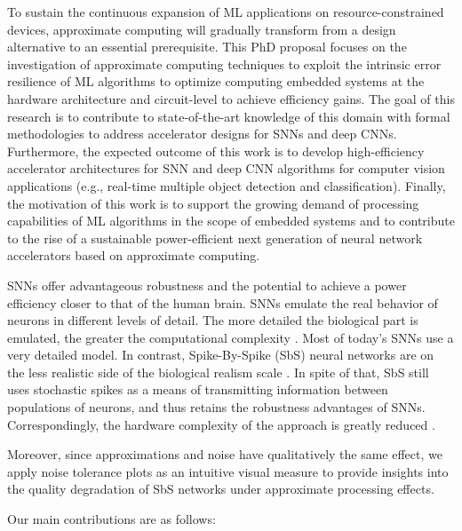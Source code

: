 	To sustain the continuous expansion of ML applications on resource-constrained devices, approximate computing will gradually transform from a design alternative to an essential prerequisite. This PhD proposal focuses on the investigation of approximate computing techniques to exploit the intrinsic error resilience of ML algorithms to optimize computing embedded systems at the hardware architecture and circuit-level to achieve efficiency gains. The goal of this research is to contribute to state-of-the-art knowledge of this domain with formal methodologies to address accelerator designs for SNNs and deep CNNs. Furthermore, the expected outcome of this work is to develop high-efficiency accelerator architectures for SNN and deep CNN algorithms for computer vision applications (e.g., real-time multiple object detection and classification). Finally, the motivation of this work is to support the growing demand of processing capabilities of ML algorithms in the scope of embedded systems and to contribute to the rise of a sustainable power-efficient next generation of neural network accelerators based on approximate computing.



SNNs offer advantageous robustness and the potential to achieve a power efficiency closer to that of the human brain. SNNs emulate the real behavior of neurons in different levels of detail. The more detailed the biological part is emulated, the greater the computational complexity \cite{izhikevich2004model,amunts2019human}. Most of today's SNNs use a very detailed model. In contrast, Spike-By-Spike (SbS) neural networks are on the less realistic side of the biological realism scale \cite{rotermund2019Backpropagation,ernst2007efficient}. In spite of that, SbS still uses stochastic spikes as a means of transmitting information between populations of neurons, and thus retains the robustness advantages of SNNs. Correspondingly, the hardware complexity of the approach is greatly reduced
	\cite{nevarez2020accelerator,rotermund2018massively}.



Moreover, since approximations and noise have qualitatively the same effect\cite{venkataramani2015approximate}, we apply noise tolerance plots as an intuitive visual measure to provide insights into the quality degradation of SbS networks under approximate processing effects.

Our main contributions are as follows:




